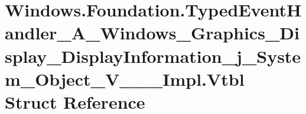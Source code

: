 \hypertarget{struct_windows_1_1_foundation_1_1_typed_event_handler___a___windows___graphics___display___displ2d6db8e7cf1fc629bdbfb5ccc4ead7c7}{}\section{Windows.\+Foundation.\+Typed\+Event\+Handler\+\_\+\+A\+\_\+\+Windows\+\_\+\+Graphics\+\_\+\+Display\+\_\+\+Display\+Information\+\_\+j\+\_\+\+System\+\_\+\+Object\+\_\+\+V\+\_\+\+\_\+\+\_\+\+Impl.\+Vtbl Struct Reference}
\label{struct_windows_1_1_foundation_1_1_typed_event_handler___a___windows___graphics___display___displ2d6db8e7cf1fc629bdbfb5ccc4ead7c7}
